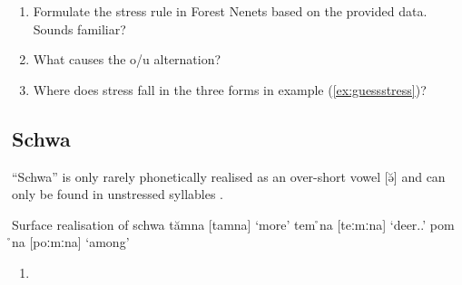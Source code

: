 \documentclass[a4paper, 12pt]{article}
\begin{document}
	\begin{enumerate}[$\gg$]
		\item Formulate the stress rule in Forest Nenets based on the provided data. Sounds familiar?
		\item What causes the o/u alternation?
		\item Where does stress fall in the three forms in example (\ref{ex:guessstress})?
	\end{enumerate}

		\subsection{Schwa}
		
	``Schwa'' is only rarely phonetically realised as an over-short vowel [ə̆] and can only be found in unstressed syllables \parencite{burkova2022}. 
	
	\pex Surface realisation of schwa
		\a tămna [tamna] `more'
		\a tem ̊na [teːmːna] `deer.{\Prol}.{\Sg}'
		\a pom ̊na [poːmːna] `among' 
	\xe
		
	\begin{enumerate}[$\gg$]
		\item 
	\end{enumerate}

%		

\printbibliography
\end{document}
